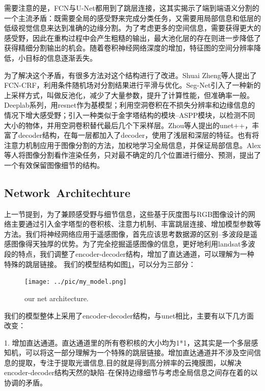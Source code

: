 \documentclass[UTF8]{ctexart}
\begin{document}
需要注意的是，FCN与U-Net都用到了跳层连接，这其实揭示了端到端语义分割的一个主流矛盾：既需要全局的感受野来完成分类任务，又需要用局部信息和低层的低级视觉信息来达到准确的边缘分割。为了考虑更多的空间信息，需要获得更大的感受野，因此在重构过程中会产生粗糙的输出，最大池化层的存在则进一步降低了获得精细分割输出的机会。随着卷积神经网络深度的增加，特征图的空间分辨率降低，小目标的信息逐渐丢失。

为了解决这个矛盾，有很多方法对这个结构进行了改进。Shuai Zheng等人\cite{zheng2015conditional}提出了FCN-CRF，利用条件随机场对分割结果进行平滑与优化。Seg-Net\cite{badrinarayanan2015segnet}引入了一种新的上采样方式，叫做反池化，减少了大量参数，提升了计算性能，但准确率一般。Deeplab\cite{chen2014semantic, chen2017deeplab, chen2017rethinking}系列，用resnet作为基模型；利用空洞卷积在不损失分辨率和边缘信息的情况下增大感受野；引入一种类似于金字塔结构的模块--ASPP模块，以检测不同大小的物体，并用空洞卷积替代最后几个下采样层。Zhou等人\cite{zhou2018unet++}提出的unet++，丰富了decoder结构，在每一层都加入了decoder，使用了浅层和深层的特征。也有将注意力机制应用于图像分割的方法\cite{zhang2018context, li2018pyramid, oktay2018attention}，加权地学习全局信息，并保证局部信息。Alex等人\cite{kirillov2019pointrend}将图像分割看作渲染任务，只对最不确定的几个位置进行细分、预测，提出了一个有效保留图像细节的结构。

\subsection{Network Architechture}

上一节提到，为了兼顾感受野与细节信息，这些基于灰度图与RGB图像设计的网络主要通过引入金字塔型的卷积核、注意力机制、丰富跳层连接、增加模型参数等方法。我们将神经网络应用于遥感图像，首先应该思考数据源的区别--多波段是遥感图像得天独厚的优势。为了完全挖掘遥感图像的信息，更好地利用landsat多波段的特点，我们调整了encoder-decoder结构，增加了直达通道，可以理解为一种特殊的跳层链接。
我们的模型结构如图\ref{fig_myModel}，可以分为三部分：
\begin{figure}[H]
    \centering
    \texttt{[image: ../pic/my\_model.png]}
    \caption{our net architecture.}
    \label{fig_myModel}
\end{figure}

我们的模型整体上采用了encoder-decoder结构，与unet相比，主要有以下几方面改变：

1. 增加直达通道。直达通道里的所有卷积核的大小均为1*1，这其实是一个多层感知机，可以将这一部分理解为一个特殊的跳层链接。增加直达通道并不涉及空间信息的提取，专注于提取光谱信息,目的就是得到高分辨率的云掩膜图，以解决encoder-decoder结构天然的缺陷--在保持边缘细节与考虑全局信息之间存在着的以协调的矛盾。
\end{document}
